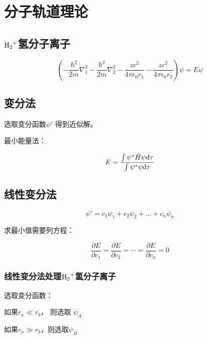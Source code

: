 \section{分子轨道理论}


\subsection{$\ce{H2+}$氢分子离子}


\begin{equation*}
    \left(-\frac{\hbar^2}{2m} \nabla_1^2 - \frac{\hbar^2}{2m} \nabla_2^2 - \frac{ze^2}{4\pi\epsilon_0r_1} - \frac{ze^2}{4\pi\epsilon_0r_2} \right) \psi = E\psi
\end{equation*}

\subsection{变分法}


选取变分函数$\psi'$ 得到近似解。


最小能量法：

\begin{equation*}
    E = \frac{\int \psi^* \hat{H} \psi \mathrm{d} \tau}{\int \psi^*  \psi \mathrm{d} \tau}
\end{equation*}


\subsection{线性变分法}

\begin{equation*}
    \psi ' = c_1 \psi_1 + c_2 \psi_2 + \dots + c_n \psi_n
\end{equation*}


求最小值需要列方程：


\begin{equation*}
    \frac{\partial E}{\partial c_1} = \frac{\partial E}{\partial c_2} = \cdots = \frac{\partial E}{\partial c_n} = 0
\end{equation*}



\subsubsection{线性变分法处理$\ce{H2+}$氢分子离子}

选取变分函数：


如果$r_a \ll r_b$， 则选取 $\psi_A$

如果$r_a \gg r_b$，则选取$\psi_B$

